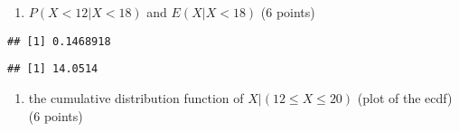 \documentclass[
]{article}
\newenvironment{Shaded}{\begin{snugshade}}{\end{snugshade}}
\newcommand{\CommentTok}[1]{\textcolor[rgb]{0.56,0.35,0.01}{\textit{#1}}}
\newcommand{\DecValTok}[1]{\textcolor[rgb]{0.00,0.00,0.81}{#1}}
\newcommand{\FunctionTok}[1]{\textcolor[rgb]{0.00,0.00,0.00}{#1}}
\newcommand{\NormalTok}[1]{#1}
\newcommand{\SpecialCharTok}[1]{\textcolor[rgb]{0.00,0.00,0.00}{#1}}
\providecommand{\tightlist}{%
  \setlength{\itemsep}{0pt}\setlength{\parskip}{0pt}}
\begin{document}
\begin{enumerate}
\def\labelenumi{\alph{enumi})}
\tightlist
\item
  \(P(X < 12|X < 18)\) and \(E(X|X < 18)\) (6 points)
\end{enumerate}

\begin{Shaded}
\end{Shaded}

\begin{verbatim}
## [1] 0.1468918
\end{verbatim}

\begin{Shaded}
\end{Shaded}

\begin{verbatim}
## [1] 14.0514
\end{verbatim}

\begin{enumerate}
\def\labelenumi{\alph{enumi})}
\setcounter{enumi}{1}
\tightlist
\item
  the cumulative distribution function of \(X|(12 \le X \le 20)\) (plot
  of the ecdf) (6 points)
\end{enumerate}

\begin{Shaded}
\end{Shaded}
\end{document}
